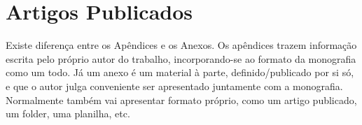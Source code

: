 \documentclass[twoside,english,brazilian]{UNISINOSmonografia}
\begin{document}
\annex
\chapter{Artigos Publicados}
Existe diferença entre os Apêndices e os Anexos.  Os apêndices trazem informação escrita pelo próprio autor do trabalho, incorporando-se ao formato da monografia como um todo.  Já um anexo é um material à parte, definido/publicado por si só, e que o autor julga conveniente ser apresentado juntamente com a monografia.  Normalmente também vai apresentar formato próprio, como um artigo publicado, um folder, uma planilha, etc.
\end{document}
